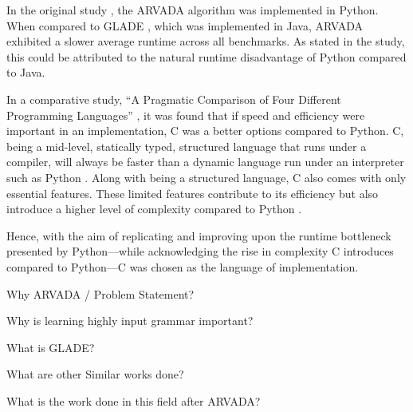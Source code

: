 In the original study \cite{kulkarniLearningHighlyRecursive2021}, the ARVADA algorithm was implemented in Python. When compared to GLADE \cite{bastaniSynthesizingProgramInput}, which was implemented in Java, ARVADA exhibited a slower average runtime across all benchmarks. As stated in the study, this could be attributed to the natural runtime disadvantage of Python compared to Java.

\vspace{\baselineskip}
In a comparative study, \enquote{A Pragmatic Comparison of Four Different Programming Languages} \cite{aliPragmaticComparisonFour2021}, it was found that if speed and efficiency were important in an implementation, C was a better options compared to Python. C, being a mid-level, statically typed, structured language that runs under a compiler, will always be faster than a dynamic language run under an interpreter such as Python \cite{kumarPythonLanguageComparison2022}. Along with being a structured language, C also comes with only essential features. These limited features contribute to its efficiency but also introduce a higher level of complexity compared to Python \cite{aliPragmaticComparisonFour2021}\cite{kumarPythonLanguageComparison2022}.

\vspace{\baselineskip}
Hence, with the aim of replicating and improving upon the runtime bottleneck presented by Python—while acknowledging the rise in complexity C introduces compared to Python—C was chosen as the language of implementation.

Why ARVADA / Problem Statement?

Why is learning highly input grammar important?

What is GLADE?

What are other Similar works done?

What is the work done in this field after ARVADA?



